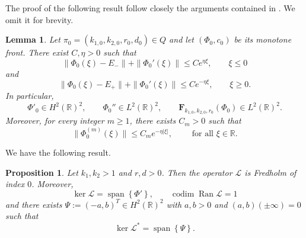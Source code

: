 \documentclass[11pt]{article}
\numberwithin{equation}{section}
\newcommand{\1}{\mathbbm{1}}
\numberwithin{equation}{section}
\newtheorem{proposition}[theorem]{Proposition}
\newtheorem{lemma}[theorem]{Lemma}
\theoremstyle{definition}
\def \R {\mathbb{R}}
\def \F {\mathbf{F}}
\def \L {\mathcal{L}}
\numberwithin{equation}{section}
\begin{document}
The proof of the following result follow closely the arguments contained in  \cite[Lemma 2.2]{kenne2026}. We omit it for brevity. 

\begin{lemma}\label{lemdecay} Let $\pi_0=(k_{1,0}, k_{2,0},r_0,d_0) \in Q$ and let $(\Phi_0, c_0)$ be its monotone front. There exist $C,\eta>0$ such that
	\begin{equation}\label{cy0}
		\|\Phi_0(\xi)-E_-\| + \|\Phi_0'(\xi)\|  \leq C e^{\eta\xi}, \qquad \xi\leq 0
	\end{equation}
	and 
	\begin{equation}\label{cy1}
		\|\Phi_0(\xi)-E_+\| + \|\Phi_0'(\xi)\|  \leq C e^{-\eta\xi}, \qquad \xi\geq 0.
	\end{equation}
	In particular,
	\begin{equation}\label{cy2}
		\Phi'_0\in H^2(\R)^2, \qquad \Phi_0'' \in L^2(\R)^2, \qquad \F_{k_{1,0}, k_{2,0},r_0}(\Phi_0)\in L^2(\R)^2.
	\end{equation}
Moreover, for every integer $m\geq 1$, there exists $C_m>0$ such that
	\begin{equation}\label{generaldecay}
		\|\Phi_0^{(m)}(\xi)\|\leq C_me^{-\eta|\xi|}, \qquad \text{ for all } \xi\in \R.
	\end{equation}
\end{lemma}

 We have the following result. 

\begin{proposition}\label{propfredholm}
Let $k_1,k_2>1$ and $r,d>0$. Then the operator $\L$ is Fredholm of index $0$.
Moreover,
\begin{equation}\label{kerL}
\operatorname{ker}\L=\operatorname{span}\left\{\Phi'\right\}, \qquad\operatorname{codim} \operatorname{Ran} \mathcal{L}=1
\end{equation}
and there exists  $\Psi:=(-a,b)^T\in H^2(\R)^2$ with $a,b>0$ and $(a,b)(\pm \infty)=0$ such that
\begin{equation}\label{kerL*}
	\operatorname{ker}\L^*=\operatorname{span}\left\{ \Psi\right\}.
\end{equation}

\end{proposition}
\end{document}
